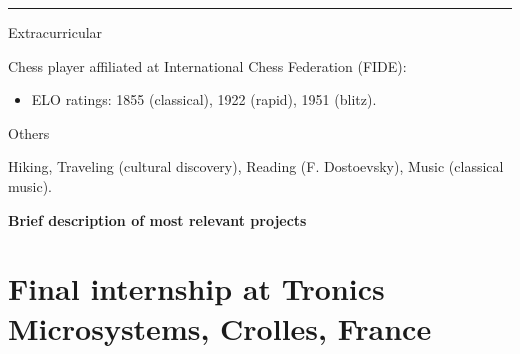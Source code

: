 \documentclass[a4paper,10pt]{article}
\newlength{\cvcolumngapwidth}
\newlength{\cvleftcolumnwidth}
\newlength{\cvrightcolumnwidth}
\newcommand{\cvsectionstyle}[1]{{\large\cvsectionfont\textcolor{cvsectioncolor}{#1}}}
\newcommand{\cvheadingstyle}[1]{{\cvheadingfont\textcolor{cvheadingcolor}{#1}}}
\newlength{\cvafteritemskipamount}
\newlength{\cvaftersectionskipamount}
\newlength{\cvparskip}
\newcommand{\cvsection}[1]{
    \begin{minipage}[t]{\cvleftcolumnwidth}
        \raggedleft\cvsectionstyle{#1}
    \end{minipage}%
    \hspace{\cvcolumngapwidth}%
    \begin{minipage}[t]{\cvrightcolumnwidth}
        \textcolor{cvrulecolor}{\rule{\cvrightcolumnwidth}{0.3mm}}
    \end{minipage}

    \vspace{\cvaftersectionskipamount}
}
\newcommand{\cvitem}[2]{
    \begin{minipage}[t]{\cvleftcolumnwidth}
        \raggedleft #1
    \end{minipage}%
    \hspace{\cvcolumngapwidth}%
    \begin{minipage}[t]{\cvrightcolumnwidth}
        \setlength{\parskip}{\cvparskip} #2
    \end{minipage}

    \vspace{\cvafteritemskipamount}
}
\begin{document}


\cvsection{Miscellaneous}
\cvitem{
    \cvheadingstyle{Extracurricular}
}{

    Chess player affiliated at International Chess Federation (FIDE):
    \begin{itemize}[leftmargin=*]
        \item ELO ratings: 1855 (classical), 1922 (rapid), 1951 (blitz).
    \end{itemize}
}
\cvitem{
    \cvheadingstyle{Others}
}{
    Hiking, Traveling (cultural discovery), Reading (F. Dostoevsky), Music (classical music).


}

\clearpage

\newpage


\begin{center}
    \Large{\textbf{Brief description of most relevant projects}}
\end{center}
\section{Final internship at Tronics Microsystems, Crolles, France}
\end{document}
